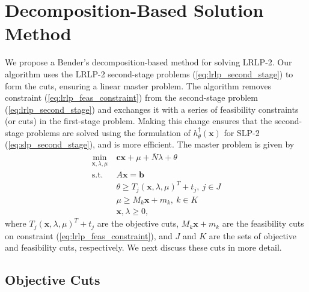 \documentclass[11pt]{article}
\newcommand{\x}{\mathbf{x}}
\renewcommand{\c}{\mathbf{c}}
\renewcommand{\b}{\mathbf{b}}
\newcommand{\st}{\mbox{s.t.}}
\begin{document}
\section{Decomposition-Based Solution Method} \label{sec:soln_algorithm}

We propose a Bender's decomposition-based method for solving LRLP-2.
Our algorithm uses the LRLP-2 second-stage problems (\ref{eq:lrlp_second_stage}) to form the cuts, ensuring a linear master problem.
The algorithm removes constraint (\ref{eq:lrlp_feas_constraint}) from the second-stage problem (\ref{eq:lrlp_second_stage}) and exchanges it with a series of feasibility constraints (or cuts) in the first-stage problem.
Making this change ensures that the second-stage problems are solved using the formulation of $h^\dagger_\theta(\x)$ for SLP-2 (\ref{eq:slp_second_stage}), and is more efficient.
The master problem is given by
\begin{align}
	\min_{\x,\lambda,\mu} \ & \c\x + \mu + \bar{N}\lambda + \theta \label{eq:master_problem}\\
	\st \ & A\x = \b \nonumber \\
	& \theta \geq T_j (\x,\lambda,\mu)^T + t_j, \ j \in J \nonumber \\
	& \mu \geq M_k \x + m_k, \ k \in K \nonumber \\
	& \x,\lambda \geq 0, \nonumber
\end{align}
where $T_j (\x,\lambda,\mu)^T + t_j$ are the objective cuts, $M_k \x + m_k$ are the feasibility cuts on constraint (\ref{eq:lrlp_feas_constraint}), and $J$ and $K$ are the sets of objective and feasibility cuts, respectively.
We next discuss these cuts in more detail.

\subsection{Objective Cuts}
\end{document}
